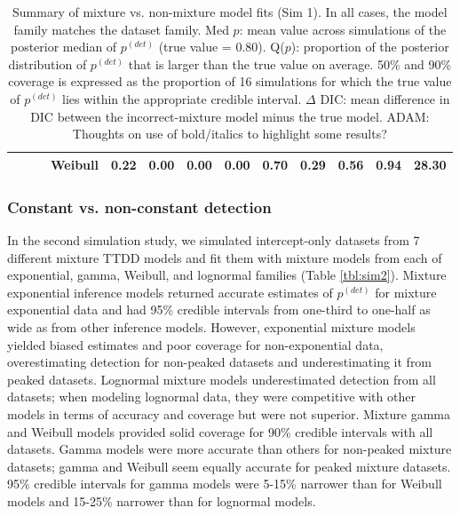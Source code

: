 \documentclass[useAMS,usenatbib,referee,12pt]{article}
\newcommand{\adam}[1]{{\color{blue} ADAM: #1}}
\begin{document}
\begin{table}[ht]
\begin{tabular}{l|l|l|l|cccc|cccc||c}
 & & &   Weibull & 0.22 & 0.00 & 0.00 & 0.00 & 0.70 & 0.29 & 0.56 & 0.94 & 28.30 \\ 
   \hline
\end{tabular}
\caption{\label{tbl:sim1} Summary of mixture vs. non-mixture model fits (Sim 1).  In all cases, the model family matches the dataset family.  Med $p$: mean value across simulations of the posterior median of $p^{(det)}$ (true value = 0.80).  Q($p$): proportion of the posterior distribution of $p^{(det)}$ that is larger than the true value on average.  50\% and 90\% coverage is expressed as the proportion of 16 simulations for which the true value of $p^{(det)}$ lies within the appropriate credible interval.  $\Delta$ DIC: mean difference in DIC between the incorrect-mixture model minus the true model. \adam{Thoughts on use of bold/italics to highlight some results?}}
\end{table}

\subsubsection{Constant vs. non-constant detection}\label{sec:family}

In the second simulation study, we simulated intercept-only datasets from 7 different mixture TTDD models and fit them with mixture models from each of exponential, gamma, Weibull, and lognormal families (Table \ref{tbl:sim2}).  Mixture exponential inference models returned accurate estimates of $p^{(det)}$ for mixture exponential data and had 95\% credible intervals from one-third to one-half as wide as from other inference models.  However, exponential mixture models yielded biased estimates and poor coverage for non-exponential data, overestimating detection for non-peaked datasets and underestimating it from peaked datasets.  Lognormal mixture models underestimated detection from all datasets; when modeling lognormal data, they were competitive with other models in terms of accuracy and coverage but were not superior.  Mixture gamma and Weibull models provided solid coverage for 90\% credible intervals with all datasets.  Gamma models were more accurate than others for non-peaked mixture datasets; gamma and Weibull seem equally accurate for peaked mixture datasets.  95\% credible intervals for gamma models were 5-15\% narrower than for Weibull models and 15-25\% narrower than for lognormal models.
\end{document}
